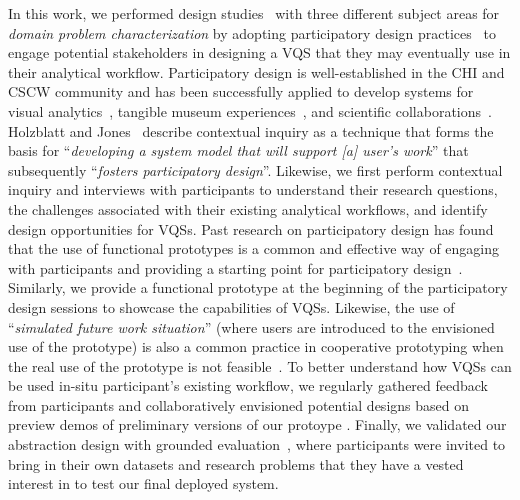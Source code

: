 {  \par In this work, we performed design studies~\cite{lam2012empirical,shneiderman2006strategies,Sedlmair2012} with three different subject areas for \textit{domain problem characterization} by adopting participatory design practices~\cite{Gould1983,Muller1993} to engage potential stakeholders in designing a VQS that they may eventually use in their analytical workflow. Participatory design is well-established in the CHI and CSCW community and has been successfully applied to develop systems for visual analytics~\cite{Aragon2008,Chuang2012}, tangible museum experiences~\cite{Ciolfi2016}, and scientific collaborations~\cite{Poon2008,Chen2016}. Holzblatt and Jones~\cite{HoltzblattJones} describe contextual inquiry as a technique that forms the basis for ``\textit{developing a system model that will support [a] user's work}'' that subsequently ``\textit{fosters participatory design}''. Likewise, we first perform contextual inquiry and interviews with participants to understand their research questions, the challenges associated with their existing analytical workflows, and identify design opportunities for VQSs. Past research on participatory design has found that the use of functional prototypes is a common and effective way of engaging with participants and providing a starting point for participatory design~\cite{Ciolfi2016}. Similarly, we provide a functional prototype at the beginning of the participatory design sessions to showcase the capabilities of VQSs.  Likewise, the use of ``\textit{simulated future work situation}'' (where users are introduced to the envisioned use of the prototype) is also a common practice in cooperative prototyping when the real use of the prototype is not feasible~\cite{Grnbak1991}. To better understand how VQSs can be used in-situ participant's existing workflow, we regularly gathered feedback from participants and collaboratively envisioned potential designs based on preview demos of preliminary versions of our protoype \zvpp. Finally, we validated our abstraction design with grounded evaluation~\cite{Plaisant2004,Isenberg2008}, where participants were invited to bring in their own datasets and research problems that they have a vested interest in to test our final deployed system.
}
